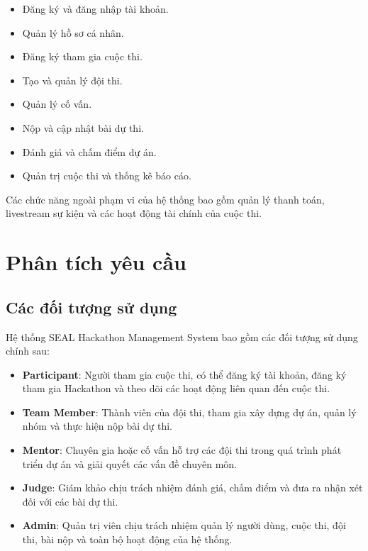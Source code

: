 \begin{itemize}
	\item Đăng ký và đăng nhập tài khoản.
	\item Quản lý hồ sơ cá nhân.
	\item Đăng ký tham gia cuộc thi.
	\item Tạo và quản lý đội thi.
	\item Quản lý cố vấn.
	\item Nộp và cập nhật bài dự thi.
	\item Đánh giá và chấm điểm dự án.
	\item Quản trị cuộc thi và thống kê báo cáo.
\end{itemize}

Các chức năng ngoài phạm vi của hệ thống bao gồm quản lý thanh toán, livestream sự kiện và các hoạt động tài chính của cuộc thi.
	
	\chapter{Phân tích yêu cầu}
	\section{Các đối tượng sử dụng}
	
	Hệ thống SEAL Hackathon Management System bao gồm các đối tượng sử dụng chính sau:
	
	\begin{itemize}
		\item \textbf{Participant}: Người tham gia cuộc thi, có thể đăng ký tài khoản, đăng ký tham gia Hackathon và theo dõi các hoạt động liên quan đến cuộc thi.
		
		\item \textbf{Team Member}: Thành viên của đội thi, tham gia xây dựng dự án, quản lý nhóm và thực hiện nộp bài dự thi.
		
		\item \textbf{Mentor}: Chuyên gia hoặc cố vấn hỗ trợ các đội thi trong quá trình phát triển dự án và giải quyết các vấn đề chuyên môn.
		
		\item \textbf{Judge}: Giám khảo chịu trách nhiệm đánh giá, chấm điểm và đưa ra nhận xét đối với các bài dự thi.
		
		\item \textbf{Admin}: Quản trị viên chịu trách nhiệm quản lý người dùng, cuộc thi, đội thi, bài nộp và toàn bộ hoạt động của hệ thống.
	\end{itemize}
